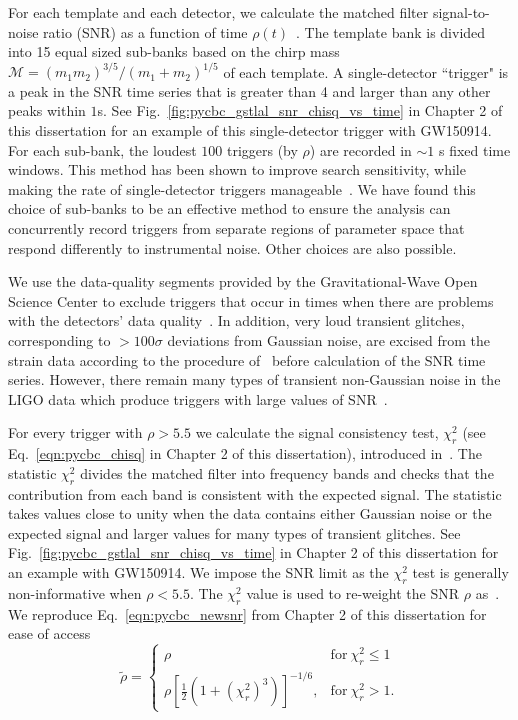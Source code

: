 For each template and each detector, we calculate the matched filter signal-to-noise ratio (SNR) as a function of time $\rho(t)$~\citep{Allen:2005fk}. The template bank is divided into 15 equal sized sub-banks based on the chirp mass $\mathcal{M} = (m_1m_2)^{3/5} / (m_1+m_2)^{1/5}$ of each template. A single-detector ``trigger" is a peak in the SNR time series that is greater than 4 and larger than any other peaks within $1$s. See Fig.~\ref{fig:pycbc_gstlal_snr_chisq_vs_time} in Chapter 2 of this dissertation for an example of this single-detector trigger with GW150914. For each sub-bank, the loudest $100$ triggers (by $\rho$) are recorded in $\sim1$ s fixed time windows. This method has been shown to improve search sensitivity, while making the rate of single-detector triggers manageable~\citep{Nitz:2018rgo}. We have found this choice of sub-banks to be an effective method to ensure the analysis can concurrently record triggers from separate regions of parameter space that respond differently to instrumental noise. Other choices are also possible.

 We use the data-quality segments provided by the Gravitational-Wave Open Science Center to exclude triggers that occur in times when there are problems with the detectors' data quality~\citep{TheLIGOScientific:2016zmo,TheLIGOScientific:2017lwt}.
 In addition, very loud transient glitches, corresponding to $>100\sigma$ deviations from Gaussian noise, are excised from the strain data according to the procedure of~\cite{Usman:2015kfa} before calculation of the SNR time series. However, there remain many types of transient non-Gaussian noise in the LIGO data which produce triggers with large values of SNR~\citep{Nuttall:2015dqa,TheLIGOScientific:2016zmo,TheLIGOScientific:2017lwt}. 

 For every trigger with $\rho > 5.5$ we calculate the signal consistency test, $\chi^2_r$ (see Eq.~\ref{eqn:pycbc_chisq} in Chapter 2 of this dissertation), introduced in~\cite{Allen:2004gu}. The statistic $\chi^2_r$ divides the matched filter into frequency bands and checks that the contribution from each band is consistent with the expected signal. The statistic takes values close to unity when the data contains either Gaussian noise or the expected signal and larger values for many types of transient glitches. See Fig.~\ref{fig:pycbc_gstlal_snr_chisq_vs_time} in Chapter 2 of this dissertation for an example with GW150914. We impose the SNR limit as the $\chi^2_r$ test is generally non-informative when $\rho < 5.5$. The $\chi^2_r$ value is used to re-weight the SNR $\rho$ as~\citep{Colaboration:2011np, Babak:2012zx}. We reproduce Eq.~\ref{eqn:pycbc_newsnr} from Chapter 2 of this dissertation for ease of access
%
\begin{equation}
 \tilde{\rho} = \begin{cases} 
        \rho & \mathrm{for}\ \chi^2_r \leq 1 \\
        \rho\left[ \frac{1}{2} \left(1 + \left(\chi^2_r\right)^3\right)\right]^{-1/6}, & 
        \mathrm{for}\ \chi^2_r > 1.
    \end{cases}
\end{equation}
%

